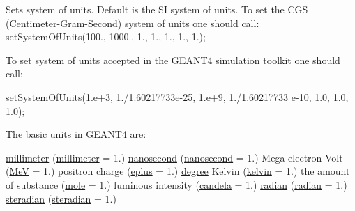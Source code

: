 Sets system of units. Default is the SI system of units. To set the C\+GS (Centimeter-\/\+Gram-\/\+Second) system of units one should call\+: set\+System\+Of\+Units(100., 1000., 1., 1., 1., 1., 1.);

To set system of units accepted in the G\+E\+A\+N\+T4 simulation toolkit one should call\+: 
\begin{DoxyCode}
\hyperlink{class_xml_tools_1_1_evaluator_a94fce6a14158fd1e9af0135268f0f68b}{setSystemOfUnits}(1.\hyperlink{_volumes_8cpp_a8a9a1f93e9b09afccaec215310e64142}{e}+3, 1./1.60217733\hyperlink{_volumes_8cpp_a8a9a1f93e9b09afccaec215310e64142}{e}-25, 1.\hyperlink{_volumes_8cpp_a8a9a1f93e9b09afccaec215310e64142}{e}+9, 1./1.60217733
      \hyperlink{_volumes_8cpp_a8a9a1f93e9b09afccaec215310e64142}{e}-10,
                 1.0, 1.0, 1.0);
\end{DoxyCode}


The basic units in G\+E\+A\+N\+T4 are\+: 
\begin{DoxyCode}
\hyperlink{namespacedd4hep_a1b3044c28560621f033b6f0fb9a15854}{millimeter}              (\hyperlink{namespacedd4hep_a1b3044c28560621f033b6f0fb9a15854}{millimeter} = 1.)
\hyperlink{namespacedd4hep_acd3d49e76b85c03111a8bdcaffe4c8c7}{nanosecond}              (\hyperlink{namespacedd4hep_acd3d49e76b85c03111a8bdcaffe4c8c7}{nanosecond} = 1.)
Mega electron Volt      (\hyperlink{namespacedd4hep_a6dee62809c6ee54d2fc90671f4dc8b91}{MeV}        = 1.)
positron charge         (\hyperlink{namespacedd4hep_a96ccff254b6dcebf179c3630f6205857}{eplus}      = 1.)
\hyperlink{namespacedd4hep_a9fbc5184e0fbd4235e8efb28cc3ab3af}{degree} Kelvin           (\hyperlink{namespacedd4hep_ae4984489719e11b38858934cc4c1e54e}{kelvin}     = 1.)
the amount of substance (\hyperlink{namespacedd4hep_a09193b4505440f7f2a58f02fbea9120f}{mole}       = 1.)
luminous intensity      (\hyperlink{namespacedd4hep_ad6c9a17d1f654cad2f47f590edc1bec4}{candela}    = 1.)
\hyperlink{namespacedd4hep_aa67a6662923dd0138a6bf6713eddcebb}{radian}                  (\hyperlink{namespacedd4hep_aa67a6662923dd0138a6bf6713eddcebb}{radian}     = 1.)
\hyperlink{namespacedd4hep_a0a902cdeced2ad28da2d32515e540867}{steradian}               (\hyperlink{namespacedd4hep_a0a902cdeced2ad28da2d32515e540867}{steradian}  = 1.)
\end{DoxyCode}
 \hypertarget{class_xml_tools_1_1_evaluator_a46b7fb4c5d1366cfa70a0b1faf1a8234}{}\label{class_xml_tools_1_1_evaluator_a46b7fb4c5d1366cfa70a0b1faf1a8234} 
